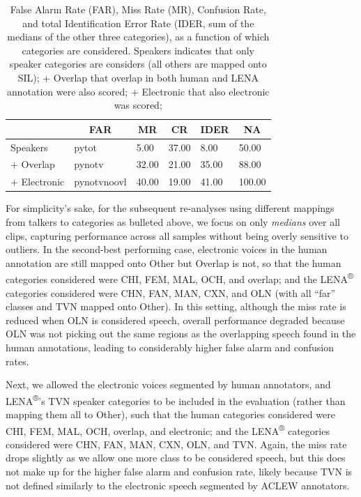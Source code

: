 \documentclass[english,table,man,floatsintext]{apa6}
\begin{document}
\begin{table}[tbp]

\begin{center}
\begin{threeparttable}

\caption{\label{tab:tabalts}False Alarm Rate (FAR), Miss Rate (MR), Confusion Rate, and total Identification Error Rate (IDER, sum of the medians of the other three categories), as a function of which categories are considered. Speakers indicates that only speaker categories are considers (all others are mapped onto SIL); + Overlap that overlap in both human and LENA annotation were also scored; + Electronic that also electronic was scored;}

\begin{tabular}{llllll}
\toprule
 & \multicolumn{1}{c}{FAR} & \multicolumn{1}{c}{MR} & \multicolumn{1}{c}{CR} & \multicolumn{1}{c}{IDER} & \multicolumn{1}{c}{NA}\\
\midrule
Speakers & pytot & 5.00 & 37.00 & 8.00 & 50.00\\
+ Overlap & pynotv & 32.00 & 21.00 & 35.00 & 88.00\\
+ Electronic & pynotvnoovl & 40.00 & 19.00 & 41.00 & 100.00\\
\bottomrule
\end{tabular}

\end{threeparttable}
\end{center}

\end{table}

For simplicity's sake, for the subsequent re-analyses using different
mappings from talkers to categories as bulleted above, we focus on only
\emph{medians} over all clips, capturing performance across all samples
without being overly sensitive to outliers. In the second-best
performing case, electronic voices in the human annotation are still
mapped onto Other but Overlap is not, so that the human categories
considered were CHI, FEM, MAL, OCH, and overlap; and the
LENA\textsuperscript{®} categories considered were CHN, FAN, MAN, CXN,
and OLN (with all \enquote{far} classes and TVN mapped onto Other). In
this setting, although the miss rate is reduced when OLN is considered
speech, overall performance degraded because OLN was not picking out the
same regions as the overlapping speech found in the human annotations,
leading to considerably higher false alarm and confusion rates.

Next, we allowed the electronic voices segmented by human annotators,
and LENA\textsuperscript{®}'s TVN speaker categories to be included in
the evaluation (rather than mapping them all to Other), such that the
human categories considered were CHI, FEM, MAL, OCH, overlap, and
electronic; and the LENA\textsuperscript{®} categories considered were
CHN, FAN, MAN, CXN, OLN, and TVN. Again, the miss rate drops slightly as
we allow one more class to be considered speech, but this does not make
up for the higher false alarm and confusion rate, likely because TVN is
not defined similarly to the electronic speech segmented by ACLEW
annotators.
\end{document}

